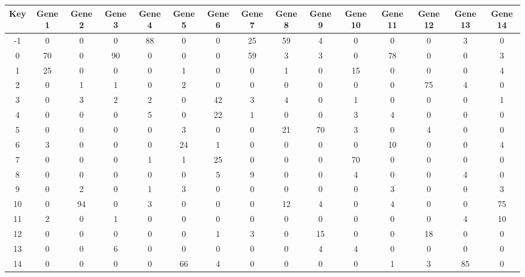 \begin{tabular}{|c|c|c|c|c|c|c|c|c|c|c|c|c|c|c|}
\hline
Key & Gene 1 & Gene 2 & Gene 3 & Gene 4 & Gene 5 & Gene 6 & Gene 7 & Gene 8 & Gene 9 & Gene 10 & Gene 11 & Gene 12 & Gene 13 & Gene 14 \\
\hline
-1 & 0 & 0 & 0 & 88 & 0 & 0 & 25 & 59 & 4 & 0 & 0 & 0 & 3 & 0 \\
0 & 70 & 0 & 90 & 0 & 0 & 0 & 59 & 3 & 3 & 0 & 78 & 0 & 0 & 3 \\
1 & 25 & 0 & 0 & 0 & 1 & 0 & 0 & 1 & 0 & 15 & 0 & 0 & 0 & 4 \\
2 & 0 & 1 & 1 & 0 & 2 & 0 & 0 & 0 & 0 & 0 & 0 & 75 & 4 & 0 \\
3 & 0 & 3 & 2 & 2 & 0 & 42 & 3 & 4 & 0 & 1 & 0 & 0 & 0 & 1 \\
4 & 0 & 0 & 0 & 5 & 0 & 22 & 1 & 0 & 0 & 3 & 4 & 0 & 0 & 0 \\
5 & 0 & 0 & 0 & 0 & 3 & 0 & 0 & 21 & 70 & 3 & 0 & 4 & 0 & 0 \\
6 & 3 & 0 & 0 & 0 & 24 & 1 & 0 & 0 & 0 & 0 & 10 & 0 & 0 & 4 \\
7 & 0 & 0 & 0 & 1 & 1 & 25 & 0 & 0 & 0 & 70 & 0 & 0 & 0 & 0 \\
8 & 0 & 0 & 0 & 0 & 0 & 5 & 9 & 0 & 0 & 4 & 0 & 0 & 4 & 0 \\
9 & 0 & 2 & 0 & 1 & 3 & 0 & 0 & 0 & 0 & 0 & 3 & 0 & 0 & 3 \\
10 & 0 & 94 & 0 & 3 & 0 & 0 & 0 & 12 & 4 & 0 & 4 & 0 & 0 & 75 \\
11 & 2 & 0 & 1 & 0 & 0 & 0 & 0 & 0 & 0 & 0 & 0 & 0 & 4 & 10 \\
12 & 0 & 0 & 0 & 0 & 0 & 1 & 3 & 0 & 15 & 0 & 0 & 18 & 0 & 0 \\
13 & 0 & 0 & 6 & 0 & 0 & 0 & 0 & 0 & 4 & 4 & 0 & 0 & 0 & 0 \\
14 & 0 & 0 & 0 & 0 & 66 & 4 & 0 & 0 & 0 & 0 & 1 & 3 & 85 & 0 \\
\hline
\end{tabular}